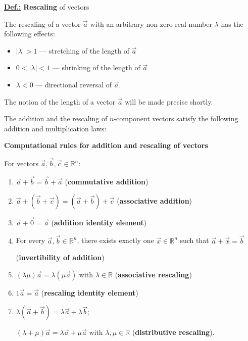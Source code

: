 \medskip
\noindent
\underline{\bf Def.:}
{\bf Rescaling} of vectors
%
\be
{}
\ee
%

\medskip
\noindent
The rescaling of a vector $\vec{a}$ with an arbitrary non-zero real number  $\lambda$ has the following effects:
%
\begin{itemize}
	\item $|\lambda| > 1$ --- stretching of the length of $\vec{a}$
	\item $0 < |\lambda| < 1$ --- shrinking of the length of 
	$\vec{a}$
	\item $\lambda < 0$ --- directional reversal of $\vec{a}$.
\end{itemize}
%
The notion of the length of a vector $\vec{a}$ will be made precise shortly.

\medskip
\noindent
The addition and the rescaling of $n$-component vectors satisfy the following addition and multiplication laws:

\medskip
\noindent
{\bf Computational rules for addition and rescaling of vectors}

\noindent
For vectors $\vec{a}, \vec{b}, \vec{c} \in {\mathbb R}^{n}$:
%
\begin{enumerate}
	\item $\vec{a}+\vec{b} = \vec{b}+\vec{a}$
	\hfill ({\bf commutative addition})
	\item $\vec{a}+(\vec{b}+\vec{c}) = (\vec{a}+\vec{b})+\vec{c}$
	\hfill ({\bf associative addition})
	\item $\vec{a}+\vec{0}=\vec{a}$ \hfill ({\bf addition identity element})
	\item For every $\vec{a}, \vec{b} \in {\mathbb R}^{n}$, there exists exactly one  $\vec{x} \in {\mathbb R}^{n}$ such that $\vec{a}+\vec{x}=\vec{b}$
	
{} \hfill ({\bf invertibility of addition})
	\item $(\lambda\mu)\vec{a}=\lambda(\mu\vec{a})$ with $\lambda
	\in {\mathbb R}$ \hfill ({\bf associative rescaling})
	\item $1\vec{a}=\vec{a}$ \hfill ({\bf rescaling identity element})
	\item $\lambda(\vec{a}+\vec{b}) = \lambda\vec{a}+\lambda\vec{b}$;
	
	$(\lambda+\mu)\vec{a} = \lambda\vec{a}+\mu\vec{a}$ with $\lambda,
	\mu	\in {\mathbb R}$ \hfill ({\bf distributive rescaling}).
\end{enumerate}
%

